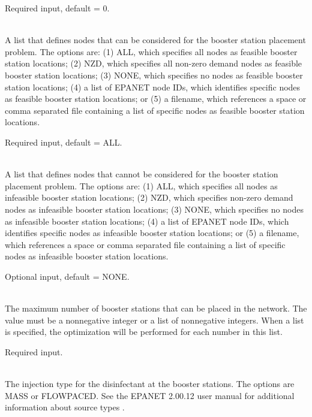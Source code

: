 \begin{description}[topsep=0pt,parsep=0.5em,itemsep=-0.4em]
\begin{description}[topsep=0pt,parsep=0.5em,itemsep=-0.4em]
                Required input, default = 0.
    \item[{feasible nodes}]\hfill
\\A list that defines nodes that can be considered for the booster station placement problem.
                The options are: (1) ALL, which specifies all nodes as feasible booster station locations;
                (2) NZD, which specifies all non-zero demand nodes as feasible booster station locations;
                (3) NONE, which specifies no nodes as feasible booster station locations;
                (4) a list of EPANET node IDs, which identifies specific nodes as feasible booster station locations; or
                (5) a filename, which references a space or comma separated file containing a list of 
                specific nodes as feasible booster station locations. 
                
                Required input, default = ALL.
    \item[{infeasible nodes}]\hfill
\\A list that defines nodes that cannot be considered for the booster station placement problem.
                The options are: (1) ALL, which specifies all nodes as infeasible booster station locations;
                (2) NZD, which specifies non-zero demand nodes as infeasible booster station locations;
                (3) NONE, which specifies no nodes as infeasible booster station locations;
                (4) a list of EPANET node IDs, which identifies specific nodes as infeasible booster station locations; or
                (5) a filename, which references a space or comma separated file containing a list of 
                specific nodes as infeasible booster station locations. 
                
                Optional input, default = NONE.
    \item[{max boosters}]\hfill
\\The maximum number of booster stations that can be placed in the
                network. The value must be a nonnegative integer or a list of
                nonnegative integers. When a list is specified, the optimization
                will be performed for each number in this list.
                
                Required input.
    \item[{type}]\hfill
\\The injection type for the disinfectant at the booster stations. 
                The options are MASS or FLOWPACED. 
                See the EPANET 2.00.12 user manual for additional information about source types \cite{EPANETusermanual}.
                

\end{description}
\end{description}

